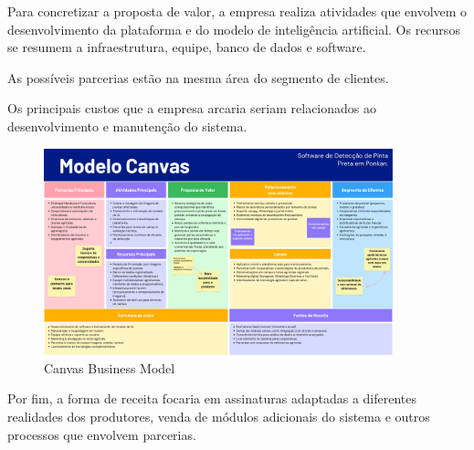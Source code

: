 \documentclass[
  a4paper,%
  12pt,%
  english,%
  brazilian,%
]{article}
\begin{document}
    Para concretizar a proposta de valor, a empresa realiza atividades que envolvem o desenvolvimento da plataforma e do modelo de inteligência artificial. Os recursos se resumem a infraestrutura, equipe, banco de dados e software. 

    As possíveis parcerias estão na mesma área do segmento de clientes.

    Os principais custos que a empresa arcaria seriam relacionados ao desenvolvimento e manutenção do sistema. 
    


        \begin{figure}[h]
\centering
\caption{Canvas Business Model}%
\label{fig:diagrama-objetos}
 \includegraphics[width=0.9\textwidth]{Logos/canvas.png}
\end{figure}

Por fim, a forma de receita focaria em assinaturas adaptadas a diferentes realidades dos produtores, venda de módulos adicionais do sistema e outros processos que envolvem parcerias.
\end{document}
